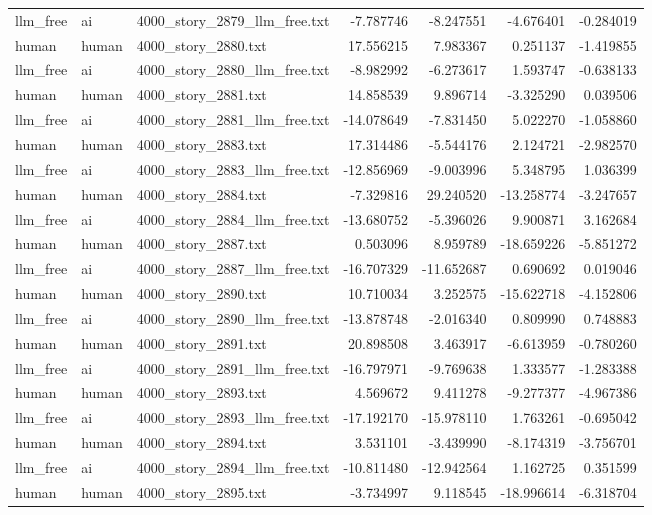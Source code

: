 \begin{longtable}{lllrrrr}
llm\_free & ai & 4000\_story\_2879\_llm\_free.txt & -7.787746 & -8.247551 & -4.676401 & -0.284019 \\
human & human & 4000\_story\_2880.txt & 17.556215 & 7.983367 & 0.251137 & -1.419855 \\
llm\_free & ai & 4000\_story\_2880\_llm\_free.txt & -8.982992 & -6.273617 & 1.593747 & -0.638133 \\
human & human & 4000\_story\_2881.txt & 14.858539 & 9.896714 & -3.325290 & 0.039506 \\
llm\_free & ai & 4000\_story\_2881\_llm\_free.txt & -14.078649 & -7.831450 & 5.022270 & -1.058860 \\
human & human & 4000\_story\_2883.txt & 17.314486 & -5.544176 & 2.124721 & -2.982570 \\
llm\_free & ai & 4000\_story\_2883\_llm\_free.txt & -12.856969 & -9.003996 & 5.348795 & 1.036399 \\
human & human & 4000\_story\_2884.txt & -7.329816 & 29.240520 & -13.258774 & -3.247657 \\
llm\_free & ai & 4000\_story\_2884\_llm\_free.txt & -13.680752 & -5.396026 & 9.900871 & 3.162684 \\
human & human & 4000\_story\_2887.txt & 0.503096 & 8.959789 & -18.659226 & -5.851272 \\
llm\_free & ai & 4000\_story\_2887\_llm\_free.txt & -16.707329 & -11.652687 & 0.690692 & 0.019046 \\
human & human & 4000\_story\_2890.txt & 10.710034 & 3.252575 & -15.622718 & -4.152806 \\
llm\_free & ai & 4000\_story\_2890\_llm\_free.txt & -13.878748 & -2.016340 & 0.809990 & 0.748883 \\
human & human & 4000\_story\_2891.txt & 20.898508 & 3.463917 & -6.613959 & -0.780260 \\
llm\_free & ai & 4000\_story\_2891\_llm\_free.txt & -16.797971 & -9.769638 & 1.333577 & -1.283388 \\
human & human & 4000\_story\_2893.txt & 4.569672 & 9.411278 & -9.277377 & -4.967386 \\
llm\_free & ai & 4000\_story\_2893\_llm\_free.txt & -17.192170 & -15.978110 & 1.763261 & -0.695042 \\
human & human & 4000\_story\_2894.txt & 3.531101 & -3.439990 & -8.174319 & -3.756701 \\
llm\_free & ai & 4000\_story\_2894\_llm\_free.txt & -10.811480 & -12.942564 & 1.162725 & 0.351599 \\
human & human & 4000\_story\_2895.txt & -3.734997 & 9.118545 & -18.996614 & -6.318704 \\

\end{longtable}
